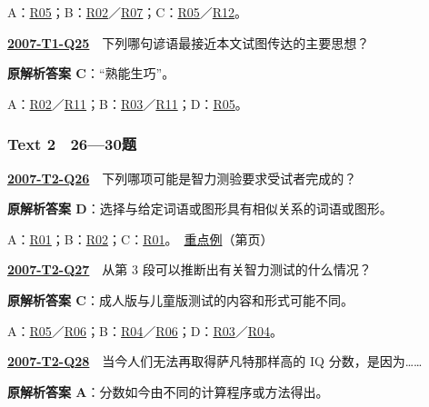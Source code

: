 \documentclass[11pt,a4paper]{article}
\begin{document}
\noindent A：\hyperref[cat-R05]{R05}；B：\hyperref[cat-R02]{R02}／\hyperref[cat-R07]{R07}；C：\hyperref[cat-R05]{R05}／\hyperref[cat-R12]{R12}。\par\smallskip
{}\label{idx-2007-T1-Q25}\noindent\textbf{\href{https://zj139.github.io/math-notes/english/a69829b7fe6a2f532d31c053/\#q25}{2007-T1-Q25}}　下列哪句谚语最接近本文试图传达的主要思想？\par\nopagebreak
\noindent\textbf{原解析答案 C}：“熟能生巧”。\par\nopagebreak
\noindent A：\hyperref[cat-R02]{R02}／\hyperref[cat-R11]{R11}；B：\hyperref[cat-R03]{R03}／\hyperref[cat-R11]{R11}；D：\hyperref[cat-R05]{R05}。\par\smallskip
{}\subsubsection{Text 2　26—30题}
\label{idx-2007-T2-Q26}\noindent\textbf{\href{https://zj139.github.io/math-notes/english/eee8045d74a87e7be65b79fe/\#q26}{2007-T2-Q26}}　下列哪项可能是智力测验要求受试者完成的？\par\nopagebreak
\noindent\textbf{原解析答案 D}：选择与给定词语或图形具有相似关系的词语或图形。\par\nopagebreak
\noindent A：\hyperref[cat-R01]{R01}；B：\hyperref[cat-R02]{R02}；C：\hyperref[cat-R01]{R01}。　\hyperref[case-2007-T2-Q26]{重点例}（第\pageref{case-2007-T2-Q26}页）\par\smallskip
{}\label{idx-2007-T2-Q27}\noindent\textbf{\href{https://zj139.github.io/math-notes/english/eee8045d74a87e7be65b79fe/\#q27}{2007-T2-Q27}}　从第 3 段可以推断出有关智力测试的什么情况？\par\nopagebreak
\noindent\textbf{原解析答案 C}：成人版与儿童版测试的内容和形式可能不同。\par\nopagebreak
\noindent A：\hyperref[cat-R05]{R05}／\hyperref[cat-R06]{R06}；B：\hyperref[cat-R04]{R04}／\hyperref[cat-R06]{R06}；D：\hyperref[cat-R03]{R03}／\hyperref[cat-R04]{R04}。\par\smallskip
{}\label{idx-2007-T2-Q28}\noindent\textbf{\href{https://zj139.github.io/math-notes/english/eee8045d74a87e7be65b79fe/\#q28}{2007-T2-Q28}}　当今人们无法再取得萨凡特那样高的 IQ 分数，是因为……\par\nopagebreak
\noindent\textbf{原解析答案 A}：分数如今由不同的计算程序或方法得出。\par\nopagebreak
\end{document}
